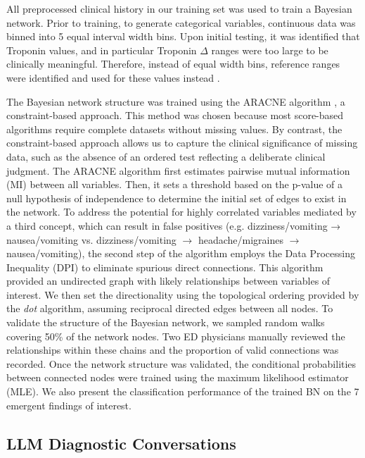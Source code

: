 All preprocessed clinical history in our training set was used to train a Bayesian network. Prior to training, to generate categorical variables, continuous data was binned into 5 equal interval width bins. Upon initial testing, it was identified that Troponin values, and in particular Troponin $\Delta$ ranges were too large to be clinically meaningful. Therefore, instead of equal width bins, reference ranges were identified and used for these values instead \cite{americanboardofinternalmedicineLaboratoryreferenceranges2024, diercksDiagnosticAccuracyPointofcare2012, pirruccelloHSTroponinInterpretation, storrowAbsoluteRelativeChanges2015, vallabhajosyulaRoleAdmissionTroponinT2017}. 

The Bayesian network structure was trained using the ARACNE algorithm \citep{margolinARACNEAlgorithmReconstruction2006}, a constraint-based approach. This method was chosen because most score-based algorithms require complete datasets without missing values. By contrast, the constraint-based approach allows us to capture the clinical significance of missing data, such as the absence of an ordered test reflecting a deliberate clinical judgment. The ARACNE algorithm first estimates pairwise mutual information (MI) between all variables. Then, it sets a threshold based on the p-value of a null hypothesis of independence to determine the initial set of edges to exist in the network. To address the potential for highly correlated variables mediated by a third concept, which can result in false positives (e.g. dizziness/vomiting → nausea/vomiting vs. dizziness/vomiting $\rightarrow$ headache/migraines $\rightarrow$ nausea/vomiting), the second step of the algorithm employs the Data Processing Inequality (DPI) to eliminate spurious direct connections. This algorithm provided an undirected graph with likely relationships between variables of interest. We then set the directionality using the topological ordering provided by the \emph{dot} algorithm, assuming reciprocal directed edges between all nodes. To validate the structure of the Bayesian network, we sampled random walks covering 50\% of the network nodes. Two ED physicians manually reviewed the relationships within these chains and the proportion of valid connections was recorded. Once the network structure was validated, the conditional probabilities between connected nodes were trained using the maximum likelihood estimator (MLE). We also present the classification performance of the trained BN on the 7 emergent findings of interest. 

\subsection{LLM Diagnostic Conversations}

